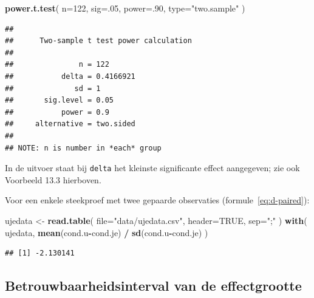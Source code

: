 \documentclass[
]{book}
\newenvironment{Shaded}{\begin{snugshade}}{\end{snugshade}}
\newcommand{\DataTypeTok}[1]{\textcolor[rgb]{0.13,0.29,0.53}{#1}}
\newcommand{\DecValTok}[1]{\textcolor[rgb]{0.00,0.00,0.81}{#1}}
\newcommand{\KeywordTok}[1]{\textcolor[rgb]{0.13,0.29,0.53}{\textbf{#1}}}
\newcommand{\NormalTok}[1]{#1}
\newcommand{\OperatorTok}[1]{\textcolor[rgb]{0.81,0.36,0.00}{\textbf{#1}}}
\newcommand{\OtherTok}[1]{\textcolor[rgb]{0.56,0.35,0.01}{#1}}
\newcommand{\StringTok}[1]{\textcolor[rgb]{0.31,0.60,0.02}{#1}}
\begin{document}
\begin{Shaded}
\begin{Highlighting}[]
\KeywordTok{power.t.test}\NormalTok{( }\DataTypeTok{n=}\DecValTok{122}\NormalTok{, }\DataTypeTok{sig=}\NormalTok{.}\DecValTok{05}\NormalTok{, }\DataTypeTok{power=}\NormalTok{.}\DecValTok{90}\NormalTok{, }\DataTypeTok{type=}\StringTok{"two.sample"}\NormalTok{ )}
\end{Highlighting}
\end{Shaded}

\begin{verbatim}
## 
##      Two-sample t test power calculation 
## 
##               n = 122
##           delta = 0.4166921
##              sd = 1
##       sig.level = 0.05
##           power = 0.9
##     alternative = two.sided
## 
## NOTE: n is number in *each* group
\end{verbatim}

In de uitvoer staat bij \texttt{delta} het kleinste significante effect aangegeven; zie ook Voorbeeld 13.3 hierboven.

Voor een enkele steekproef met twee gepaarde observaties
(formule~\eqref{eq:d-paired}):

\begin{Shaded}
\begin{Highlighting}[]
\NormalTok{ujedata \textless{}{-}}\StringTok{ }\KeywordTok{read.table}\NormalTok{( }\DataTypeTok{file=}\StringTok{"data/ujedata.csv"}\NormalTok{, }\DataTypeTok{header=}\OtherTok{TRUE}\NormalTok{, }\DataTypeTok{sep=}\StringTok{";"}\NormalTok{ )}
\KeywordTok{with}\NormalTok{( ujedata, }\KeywordTok{mean}\NormalTok{(cond.u}\OperatorTok{{-}}\NormalTok{cond.je) }\OperatorTok{/}\StringTok{ }\KeywordTok{sd}\NormalTok{(cond.u}\OperatorTok{{-}}\NormalTok{cond.je) )}
\end{Highlighting}
\end{Shaded}

\begin{verbatim}
## [1] -2.130141
\end{verbatim}

\hypertarget{betrouwbaarheidsinterval-van-de-effectgrootte}{%
\subsection{Betrouwbaarheidsinterval van de effectgrootte}\label{betrouwbaarheidsinterval-van-de-effectgrootte}}
\end{document}
